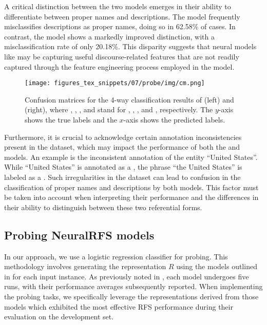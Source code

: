 A critical distinction between the two models emerges in their ability to differentiate between proper names and descriptions. The  model frequently misclassifies descriptions as proper names, doing so in 62.58\% of cases. In contrast, the  model shows a markedly improved distinction, with a misclassification rate of only 20.18\%. This disparity suggests that neural models like  may be capturing useful discourse-related features that are not readily captured through the feature engineering process employed in the  model.

\begin{figure*}
	\texttt{[image: figures\_tex\_snippets/07/probe/img/cm.png]}
	\caption[Confusion matrices for the 4-way classification results.]{Confusion matrices for the 4-way classification results of  (left) and  (right), where , , , and  stand for , , , and , respectively. The $y$-axis shows the true labels and the $x$-axis shows the predicted labels.}
	\label{fig:cm}
\end{figure*}


Furthermore, it is crucial to acknowledge certain annotation inconsistencies present in the \webnlg dataset, which may impact the performance of both the  and  models. An example is the inconsistent annotation of the entity ``United States''. While ``United States'' is annotated as a , the phrase ``the United States'' is labeled as a . Such irregularities in the dataset can lead to confusion in the classification of proper names and descriptions by both models. This factor must be taken into account when interpreting their performance and the differences in their ability to distinguish between these two referential forms.

\subsection{Probing NeuralRFS models} \label{sec:prob}

In our approach, we use a logistic regression classifier for probing. This methodology involves generating the representation $R$ using the models outlined in  for each input instance. As previously noted in , each model undergoes five runs, with their performance averages subsequently reported. When implementing the probing tasks, we specifically leverage the representations derived from those models which exhibited the most effective RFS performance during their evaluation on the development set.

